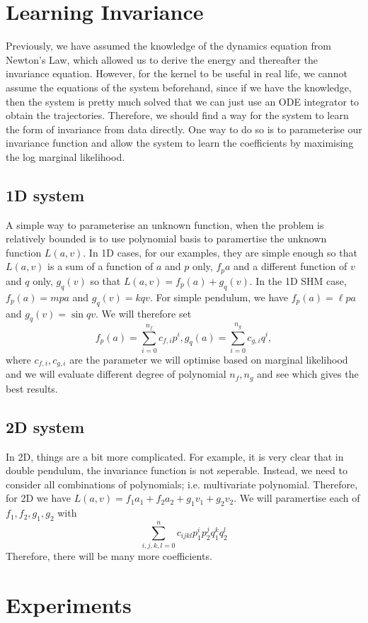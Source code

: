 \documentclass{statsmsc}
\begin{document}
\chapter{Learning Invariance}
Previously, we have assumed the knowledge of the dynamics equation from Newton's Law, which allowed us to derive the energy and thereafter the invariance equation. 
However, for the kernel to be useful in real life, we cannot assume the equations of the system beforehand, since if we have the knowledge, then the system is pretty much solved that we can just use an ODE integrator to obtain the trajectories. 
Therefore, we should find a way for the system to learn the form of invariance from data directly.
One way to do so is to parameterise our invariance function and allow the system to learn the coefficients by maximising the log marginal likelihood.
\section{1D system}
A simple way to parameterise an unknown function, when the problem is relatively bounded is to use polynomial basis to paramertise the unknown function $L(a,v)$.
In 1D cases, for our examples, they are simple enough so that $L(a,v)$ is a sum of a function of $a$ and $p$ only, $f_pa$ and a different function of $v$ and $q$ only, $g_q(v)$ so that $L(a,v)=f_p(a)+g_q(v)$.
In the 1D SHM case, $f_p(a)=mpa$ and $g_q(v)=kqv$.
For simple pendulum, we have $f_p(a)=\ell pa$ and $g_q(v)=\sin qv$.
We will therefore set $$f_p(a)=\sum_{i=0}^{n_f}c_{f,i}p^i,g_q(a)=\sum_{i=0}^{n_g}c_{g,i}q^i,$$
where $c_{f,i}, c_{g,i}$ are the parameter we will optimise based on marginal likelihood and we will evaluate different degree of polynomial $n_f, n_g$ and see which gives the best results. 

\section{2D system}
In 2D, things are a bit more complicated. For example, it is very clear that in double pendulum, the invariance function is not seperable.
Instead, we need to consider all combinations of polynomials; i.e. multivariate polynomial.
Therefore, for 2D we have $L(a,v)=f_1a_1+f_2a_2+g_1v_1+g_2v_2.$
We will paramertise each of $f_1, f_2, g_1, g_2$ with $$\sum_{i,j,k,l=0}^{n}c_{ijkl}p_1^ip_2^jq_1^kq_2^l$$
Therefore, there will be many more coefficients.

\chapter{Experiments}
\end{document}
